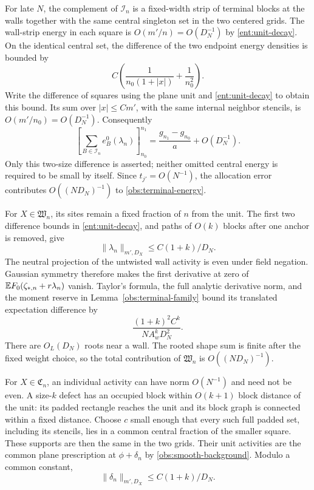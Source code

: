 For late \(N\), the complement of \(\mathcal I_n\) is a fixed-width
strip of terminal blocks at the walls together with the same central
singleton set in the two centered grids.  The wall-strip energy in
each square is \(O(m'/n)=O(D_N^{-1})\) by
\eqref{ent:unit-decay}.  On the identical central set, the difference
of the two endpoint energy densities is bounded by
\[
 C\left(\frac{1}{n_0(1+|x|)}+\frac1{n_0^2}\right).
\]
Write the difference of squares using the plane unit and
\eqref{ent:unit-decay} to obtain this bound.  Its sum over
\(|x|\le Cm'\), with the same internal neighbor stencils, is
\(O(m'/n_0)=O(D_N^{-1})\).  Consequently
\begin{equation}\label{obs:energy-allocation}
 \left[\sum_{B\in\mathcal I_n}e_B^0(\lambda_n)\right]_{n_0}^{n_1}
       =\frac{g_{n_1}-g_{n_0}}a+O(D_N^{-1}).
\end{equation}
Only this two-size difference is asserted; neither omitted central
energy is required to be small by itself.  Since \(t_{j'}=O(N^{-1})\),
the allocation error contributes \(O((ND_N)^{-1})\) to
\eqref{obs:terminal-energy}.

For \(X\in\mathfrak W_n\), its sites remain
a fixed fraction of \(n\) from the unit.  The first two difference
bounds in \eqref{ent:unit-decay}, and paths of \(O(k)\) blocks after
one anchor is removed, give
\[
                 \|\lambda_n\|_{m',D_X}\le C(1+k)/D_N.
\]
The neutral projection of the untwisted wall activity is even under
field negation.  Gaussian symmetry therefore makes the first
derivative at zero of
\(\mathbb E F_0(\zeta_{*,n}+r\lambda_n)\) vanish.  Taylor's formula, the
full analytic derivative norm, and the moment reserve in
Lemma~\ref{obs:terminal-family} bound its translated expectation
difference by
\[
             \frac{(1+k)^2 C^k}{N A_w^k D_N^2}.
\]
There are \(O_L(D_N)\) roots near a wall.  The rooted shape sum is
finite after the fixed weight choice, so the total contribution of
\(\mathfrak W_n\) is \(O((ND_N)^{-1})\).

For \(X\in\mathfrak C_n\), an individual activity can have norm
\(O(N^{-1})\) and need not be even.  A size-\(k\) defect has an
occupied block within \(O(k+1)\) block distance of the unit: its
padded rectangle reaches the unit and its block graph is connected
within a fixed distance.  Choose \(c\) small enough that every such
full padded set, including its stencils, lies in a common central
fraction of the smaller square.  These supports are then the same
in the two grids.
Their unit activities are the common plane prescription at
\(\phi+\delta_n\) by \eqref{obs:smooth-background}.  Modulo a common
constant,
\[
                 \|\delta_n\|_{m',D_X}\le C(1+k)/D_N.
\]

